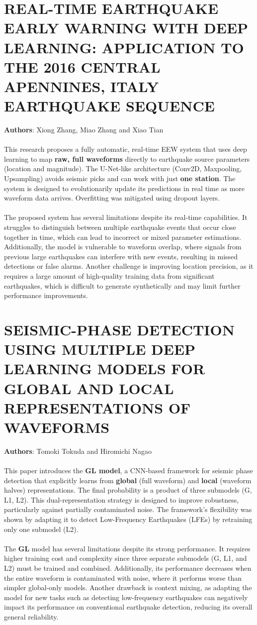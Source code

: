 \documentclass[a4paper,12pt]{report}
\begin{document}
\section{REAL-TIME EARTHQUAKE EARLY WARNING WITH DEEP LEARNING: APPLICATION TO THE 2016 CENTRAL APENNINES, ITALY EARTHQUAKE SEQUENCE}
\label{sec:2.13}
\textbf{Authors}: Xiong Zhang, Miao Zhang and Xiao Tian\\
\\
This research proposes a fully automatic, real-time EEW system that uses deep learning to map \textbf{raw, full waveforms} directly to earthquake source parameters (location and magnitude). The U-Net-like architecture (Conv2D, Maxpooling, Upsampling) avoids seismic picks and can work with just \textbf{one station}. The system is designed to evolutionarily update its predictions in real time as more waveform data arrives. Overfitting was mitigated using dropout layers.
\\
\\
The proposed system has several limitations despite its real-time capabilities. It struggles to distinguish between multiple earthquake events that occur close together in time, which can lead to incorrect or mixed parameter estimations. Additionally, the model is vulnerable to waveform overlap, where signals from previous large earthquakes can interfere with new events, resulting in missed detections or false alarms. Another challenge is improving location precision, as it requires a large amount of high-quality training data from significant earthquakes, which is difficult to generate synthetically and may limit further performance improvements.

\section{SEISMIC-PHASE DETECTION USING MULTIPLE DEEP LEARNING MODELS FOR GLOBAL AND LOCAL REPRESENTATIONS OF WAVEFORMS}
\label{sec:2.14}
\textbf{Authors}: Tomoki Tokuda and Hiromichi Nagao\\
\\
This paper introduces the \textbf{GL model}, a CNN-based framework for seismic phase detection that explicitly learns from \textbf{global} (full waveform) and \textbf{local} (waveform halves) representations. The final probability is a product of three submodels (G, L1, L2). This dual-representation strategy is designed to improve robustness, particularly against partially contaminated noise. The framework's flexibility was shown by adapting it to detect Low-Frequency Earthquakes (LFEs) by retraining only one submodel (L2).
\\
\\
The \textbf{GL} model has several limitations despite its strong performance. It requires higher training cost and complexity since three separate submodels (G, L1, and L2) must be trained and combined. Additionally, its performance decreases when the entire waveform is contaminated with noise, where it performs worse than simpler global-only models. Another drawback is context mixing, as adapting the model for new tasks such as detecting low-frequency earthquakes can negatively impact its performance on conventional earthquake detection, reducing its overall general reliability.
\end{document}
